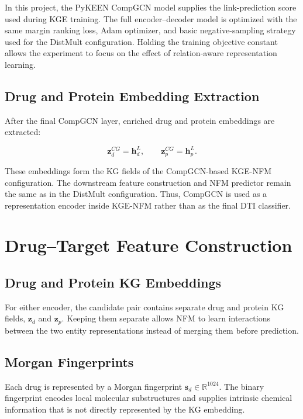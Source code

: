 In this project, the PyKEEN CompGCN model supplies the link-prediction score
used during KGE training. The full encoder--decoder model is optimized with the
same margin ranking loss, Adam optimizer, and basic negative-sampling strategy
used for the DistMult configuration. Holding the training objective constant
allows the experiment to focus on the effect of relation-aware representation
learning.

\subsection{Drug and Protein Embedding Extraction}

After the final CompGCN layer, enriched drug and protein embeddings are
extracted:

\begin{equation}
    \mathbf{z}_{d}^{CG}=\mathbf{h}_{d}^{L},
    \qquad
    \mathbf{z}_{p}^{CG}=\mathbf{h}_{p}^{L}.
\end{equation}

These embeddings form the KG fields of the CompGCN-based KGE-NFM
configuration. The downstream feature construction and NFM predictor remain
the same as in the DistMult configuration. Thus, CompGCN is used as a
representation encoder inside KGE-NFM rather than as the final DTI classifier.

\section{Drug--Target Feature Construction}

\subsection{Drug and Protein KG Embeddings}

For either encoder, the candidate pair contains separate drug and protein KG
fields, $\mathbf{z}_{d}$ and $\mathbf{z}_{p}$. Keeping them separate allows
NFM to learn interactions between the two entity representations instead of
merging them before prediction.

\subsection{Morgan Fingerprints}

Each drug is represented by a Morgan fingerprint
$\mathbf{s}_{d}\in\mathbb{R}^{1024}$. The binary fingerprint encodes local
molecular substructures and supplies intrinsic chemical information that is
not directly represented by the KG embedding.

